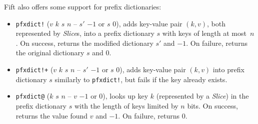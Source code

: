 \documentclass[12pt,oneside]{article}
\begin{document}
Fift also offers some support for prefix dictionaries:
\begin{itemize}
\item {\tt pfxdict!} ($v$ $k$ $s$ $n$ -- $s'$ $-1$ or $s$ $0$), adds key-value pair $(k,v)$, both represented by {\em Slice\/}s, into a prefix dictionary $s$ with keys of length at most~$n$. On success, returns the modified dictionary $s'$ and $-1$. On failure, returns the original dictionary $s$ and $0$.
\item {\tt pfxdict!+} ($v$ $k$ $s$ $n$ -- $s'$ $-1$ or $s$ $0$), adds key-value pair $(k,v)$ into prefix dictionary $s$ similarly to {\tt pfxdict!}, but fails if the key already exists.
\item {\tt pfxdict@} ($k$ $s$ $n$ -- $v$ $-1$ or $0$), looks up key $k$ (represented by a {\em Slice\/}) in the prefix dictionary $s$ with the length of keys limited by $n$ bits. On success, returns the value found $v$ and $-1$. On failure, returns $0$.
\end{itemize}
\end{document}
